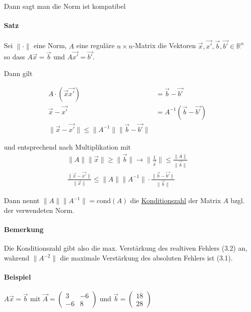 \documentclass[a4paper,ngerman]{scrbook}
\newcommand{\R}{\ensuremath{\mathbb{R}}}%
\begin{document}
Dann sagt man die Norm ist kompatibel

\paragraph{Satz}

Sei $\|\cdot\|$ eine Norm, $A$ eine reguläre $n\times n$-Matrix die Vektoren $\vec{x}, \vec{x'}, \vec{b}, \vec{b'} \in \R^n$ so dass $A\vec{x} = \vec{b}$ und $A\vec{x'} = \vec{b'}$.

Dann gilt

\begin{align*}
  A\cdot (\vec{x}\vec{x'}) &= \vec{b} - \vec{b'}\\
  \vec{x} - \vec{x'} &= A^{-1}(\vec{b} - \vec{b'})\\
  \|\vec{x}-\vec{x'}\| \leq \|A^{-1}\| \|\vec{b} - \vec{b'}\|
\end{align*}

und entsprechend nach Multiplikation mit
\begin{align}
  \|A\|\|\vec{x}\| \geq \|\vec{b}\| \to   \|\frac{1}{\vec{x}}\| \leq     \frac{\|A\|}{\|\vec{b}\|}\\
  \frac{\|\vec{x} - \vec{x'}\|}{\|\vec{x}\|} \leq \|A\| \|A^{-1}\| \cdot \frac{\|\vec{b}-\vec{b'}\|}{\|\vec{b}\|}
\end{align}

Dann nennt $\|A\| \|A^{-1}\| = \text{cond}(A)$ die \underline{Konditionszahl} der Matrix $A$ bzgl\@. der verwendeten Norm.

\paragraph{Bemerkung}

Die Konditionszahl gibt also die max\@. Verstärkung des realtiven Fehlers (3.2) an, wahrend $\|A^{-2}\|$ die maximale Verstärkung des absoluten Fehlers ist (3.1).

\paragraph{Beispiel}

$A\vec{x} = \vec{b}$ mit $\vec{A} =
\begin{pmatrix}
  3 & -6 \\ -6 & 8
\end{pmatrix}$ und $ \vec{b} =
\begin{pmatrix}
  18\\ 28
\end{pmatrix}
$
\end{document}
